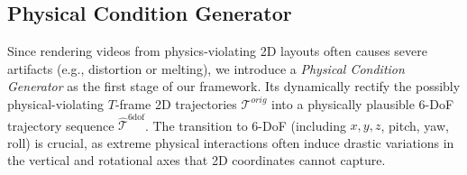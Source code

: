 \documentclass[runningheads]{llncs}
\begin{document}





\subsection{Physical Condition Generator}
\label{Physical condition generator}
Since rendering videos from physics-violating 2D layouts often causes severe artifacts (e.g., distortion or melting), we introduce a \textit{Physical Condition Generator} as the first stage of our framework. Its dynamically rectify the possibly physical-violating $T$-frame 2D trajectories $\mathcal{T}^{orig}$ into a physically plausible 6-DoF trajectory sequence $\hat{\mathcal{T}}^{\text{6dof}}$. The transition to 6-DoF (including $x, y, z$, pitch, yaw, roll) is crucial, as extreme physical interactions often induce drastic variations in the vertical and rotational axes that 2D coordinates cannot capture.
\end{document}
